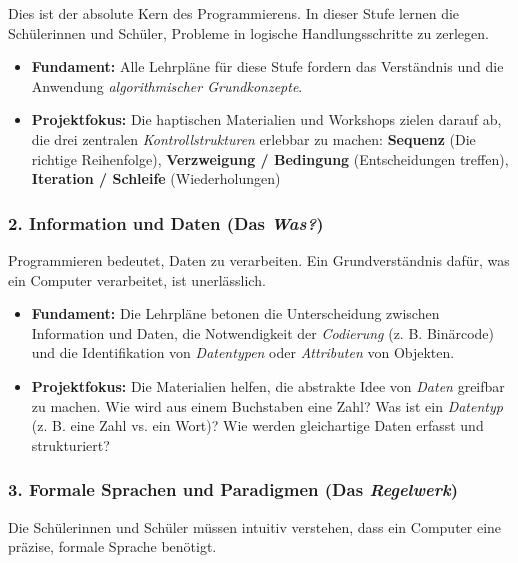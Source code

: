 \documentclass[a5paper,pagesize,10pt,bibtotoc,pointlessnumbers,
normalheadings,DIV=9,twoside=false]{scrbook}
\begin{document}
Dies ist der absolute Kern des Programmierens. In dieser Stufe lernen die Schülerinnen und Schüler, Probleme in logische Handlungsschritte zu zerlegen.

\begin{itemize}
    \item \textbf{Fundament:} Alle Lehrpläne für diese Stufe fordern das Verständnis und die Anwendung \textit{algorithmischer Grundkonzepte}.
    \item \textbf{Projektfokus:} Die haptischen Materialien und Workshops zielen darauf ab, die drei zentralen \textit{Kontrollstrukturen} erlebbar zu machen: \textbf{Sequenz} (Die richtige Reihenfolge), \textbf{Verzweigung / Bedingung} (Entscheidungen treffen), \textbf{Iteration / Schleife} (Wiederholungen)
\end{itemize}

\subsubsection{2. Information und Daten (Das \textit{Was?})}

Programmieren bedeutet, Daten zu verarbeiten. Ein Grundverständnis dafür, was ein Computer verarbeitet, ist unerlässlich.

\begin{itemize}
    \item \textbf{Fundament:} Die Lehrpläne betonen die Unterscheidung zwischen Information und Daten, die Notwendigkeit der \textit{Codierung} (z. B. Binärcode) und die Identifikation von \textit{Datentypen} oder \textit{Attributen} von Objekten.
    \item \textbf{Projektfokus:} Die Materialien helfen, die abstrakte Idee von \textit{Daten} greifbar zu machen. Wie wird aus einem Buchstaben eine Zahl? Was ist ein \textit{Datentyp} (z. B. eine Zahl vs. ein Wort)? Wie werden gleichartige Daten erfasst und strukturiert?

\end{itemize}

\subsubsection{3. Formale Sprachen und Paradigmen (Das \textit{Regelwerk})}

Die Schülerinnen und Schüler müssen intuitiv verstehen, dass ein Computer eine präzise, formale Sprache benötigt.
\end{document}
